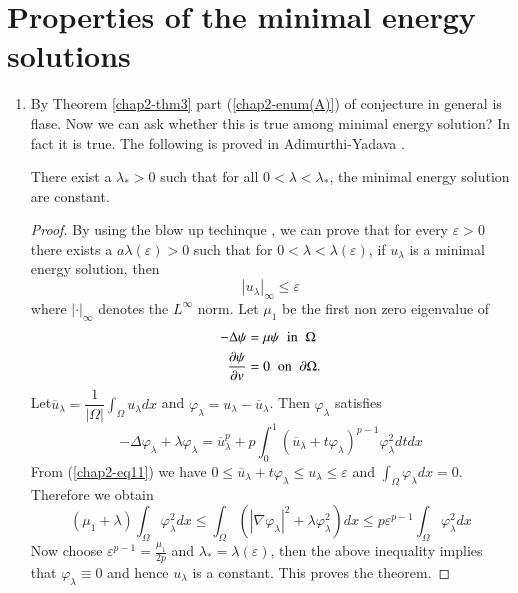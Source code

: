 \section*{Properties of the minimal energy solutions}
\begin{enumerate}[{\rm \bf 1.}]
\item By Theorem \ref{chap2-thm3} part (\ref{chap2-enum(A)}) of conjecture in general is flase. Now we can ask whether this is true among minimal energy solution? In fact it is true. The following is proved in Adimurthi-Yadava \cite{chap2-key6}.\label{chap2-enum1}  
\begin{theorem}
There exist a $\lambda_{*} > 0$ such that for all $0 < \lambda < \lambda_{*}$, the minimal energy solution are constant.\label{chap2-thm5}
\end{theorem}

\begin{proof}
By using the blow up techinque \cite{chap2-key13}, we can prove that for every $\varepsilon > 0$ there exists a $a\lambda(\varepsilon) > 0$ such that for $0 < \lambda < \lambda(\varepsilon)$, if $u_{\lambda}$ is a minimal energy solution, then
\begin{equation*}
|u_{\lambda}|_{\infty} \leq \varepsilon\tag{11} \label{chap2-eq11}
\end{equation*}
where $|\cdot|_{\infty}$ denotes the $L^{\infty}$ norm. Let $\mu_{1}$ be the first non zero eigenvalue of 
\begin{align*}
-\Delta \psi &= \mu \psi \;\; {\rm in}\;\; \Omega\\
\dfrac{\partial \psi}{\partial v} &= 0 \;\; {\rm on} \;\; \partial \Omega. 
\end{align*}
Let\pageoriginale $\overline{u}_{\lambda} = \dfrac{1}{|\Omega|} \int_{\Omega}u_{\lambda}dx$ and $\varphi_{\lambda} = u_{\lambda} - \overline{u}_{\lambda}$. Then $\varphi_{\lambda}$ satisfies
$$
-\Delta \varphi_{\lambda} + \lambda\varphi_{\lambda} = \overline{u}_{\lambda}^{p} + p \int_{0}^{1}\left(\overline{u}_{\lambda} + t\varphi_{\lambda}\right)^{p-1} \varphi_{\lambda}^{2}dtdx
$$
From (\ref{chap2-eq11}) we have $0\leq \overline{u}_{\lambda} + t\varphi_{\lambda} \leq u_{\lambda} \leq \varepsilon$ and $\int_{\Omega} \varphi_{\lambda}dx = 0$. Therefore we obtain
$$
(\mu_{1}+ \lambda) \int_{\Omega}\varphi_{\lambda}^{2}dx \leq \int_{\Omega}\left(|\nabla\varphi_{\lambda}|^{2} + \lambda \varphi_{\lambda}^{2}\right)dx \leq p \varepsilon^{p-1} \int_{\Omega} \varphi_{\lambda}^{2}dx
$$
Now choose $\varepsilon^{p-1} = \frac{\mu_{1}}{2p}$ and $\lambda_{*} = \lambda(\varepsilon)$, then the above inequality implies that $\varphi_{\lambda}\equiv 0$ and hence $u_{\lambda}$ is a constant. This proves the theorem.
\end{proof}


\end{enumerate}
